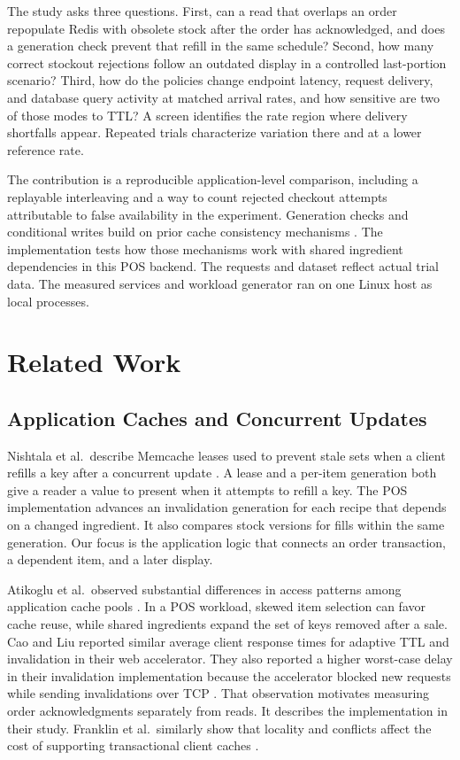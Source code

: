 \documentclass[conference]{IEEEtran}
\begin{document}
The study asks three questions. First, can a read that overlaps an order repopulate Redis with obsolete stock after the order has acknowledged, and does a generation check prevent that refill in the same schedule? Second, how many correct stockout rejections follow an outdated display in a controlled last-portion scenario? Third, how do the policies change endpoint latency, request delivery, and database query activity at matched arrival rates, and how sensitive are two of those modes to TTL? A screen identifies the rate region where delivery shortfalls appear. Repeated trials characterize variation there and at a lower reference rate.

The contribution is a reproducible application-level comparison, including a replayable interleaving and a way to count rejected checkout attempts attributable to false availability in the experiment. Generation checks and conditional writes build on prior cache consistency mechanisms \cite{nishtala2013}. The implementation tests how those mechanisms work with shared ingredient dependencies in this POS backend. The requests and dataset reflect actual trial data. The measured services and workload generator ran on one Linux host as local processes.

\section{Related Work}

\subsection{Application Caches and Concurrent Updates}

Nishtala et al.\ describe Memcache leases used to prevent stale sets when a client refills a key after a concurrent update \cite{nishtala2013}. A lease and a per-item generation both give a reader a value to present when it attempts to refill a key. The POS implementation advances an invalidation generation for each recipe that depends on a changed ingredient. It also compares stock versions for fills within the same generation. Our focus is the application logic that connects an order transaction, a dependent item, and a later display.

Atikoglu et al.\ observed substantial differences in access patterns among application cache pools \cite{atikoglu2012}. In a POS workload, skewed item selection can favor cache reuse, while shared ingredients expand the set of keys removed after a sale. Cao and Liu reported similar average client response times for adaptive TTL and invalidation in their web accelerator. They also reported a higher worst-case delay in their invalidation implementation because the accelerator blocked new requests while sending invalidations over TCP \cite{cao1998}. That observation motivates measuring order acknowledgments separately from reads. It describes the implementation in their study. Franklin et al.\ similarly show that locality and conflicts affect the cost of supporting transactional client caches \cite{franklin1997}.
\end{document}
